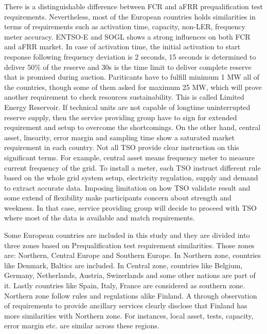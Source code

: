 There is a distinguishable difference between FCR and aFRR prequalification test requirements. Nevertheless, most of the European countries holds similarities in terms of requirements such as activation time, capacity, non-LER, frequency meter accuracy. ENTSO-E and SOGL shows a strong influences on both FCR and aFRR market. In case of activation time, the initial activation to start response following frequency deviation is 2 seconds, 15 seconds is determined to deliver 50\% of the reserve and 30s is the time limit to deliver complete reserve that is promised during auction. Pariticants have to fulfill minimum 1 MW all of the countries, though some of them asked for maximum 25 MW, which will prove another requirement to check resources sustainability. This is called Limited Energy Reservoir. If technical units are not capable of longtime uninterrupted reserve supply, then the service providing group have to sign for extended requirement and setup to overcome the shortcomings. On the other hand, central asset, linearity, error margin and sampling time show a saturated market requirement in each country. Not all TSO provide clear instruction on this significant terms. For example, central asset means frequency meter to measure current frequency of the grid. To install a meter, each TSO instruct different rule based on the whole grid system setup, electricity regulation, supply and demand to extract accurate data. Imposing limitation on how TSO validate result and some extend of flexibility make participants concern about strength and weekness. In that case, service providing group will decide to proceed with TSO where most of the data is available and match requirements.  


Some European countries are included in this study and they are divided into three zones based on Prequalification test requirement similarities. Those zones are: Northern, Central Europe and Southern Europe. In Northern zone, countries like Denmark, Baltics are included. In Central zone, countries like Belgium, Germany, Netherlands, Austria, Swizerlands and some other nations are part of it. Lastly countries like Spain, Italy, France are considered as southern zone. Northern zone follow rules and regulations alike Finland. A through observation of requirements to provide ancillary services clearly disclose that Finland has more similarities with Northern zone. For instances, local asset, tests, capacity, error margin etc. are similar across these regions. 


